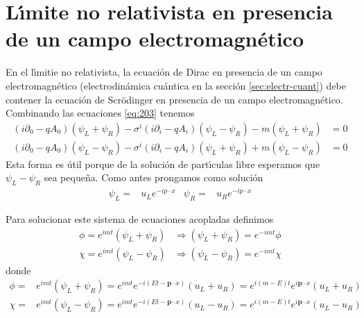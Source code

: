 \section{L\'\i mite no relativista en presencia de un campo electromagn\'etico}
\label{sec:limite-no-relat}
En el l\'\i mitie no relativista, la ecuaci\'on de Dirac en presencia de un campo electromagn\'etico (electrodin\'amica cu\'antica en la secci\'on \ref{sec:electr-cuant}) debe contener la ecuaci\'on de Scr\"odinger en presencia de un campo electromagn\'etico.
Combinando las ecuaciones \eqref{eq:203} tenemos
\begin{align}
  \label{eq:204}
  (i\partial_0- q A_0)(\psi_L+\psi_R)-{\sigma}^i(i\partial_i-q A_i)(\psi_L-\psi_R) -m(\psi_L+\psi_R) &=0\nonumber\\
  (i\partial_0-q A_0)(\psi_L-\psi_R)-{\sigma}^i(i\partial_i-q A_i)(\psi_L+\psi_R) +m(\psi_L-\psi_R) &=0
\end{align}
Esta forma es \'util porque de la soluci\'on de part\'\i culas libre esperamos que $\psi_L-\psi_R$ sea peque\~na. 
Como antes prongamos como soluci\'on
\begin{align}
  \psi_L=&u_L e^{-i p\cdot x} & \psi_R=&u_R e^{-i p\cdot x}
\end{align}

Para solucionar este sistema de ecuaciones acopladas definimos
\begin{align}
  \label{eq:216}
  \phi=e^{i m t}(\psi_L+\psi_R)&\Rightarrow(\psi_L+\psi_R)=e^{-i m t}\phi\nonumber\\
  \chi=e^{i m t}(\psi_L-\psi_R)&\Rightarrow(\psi_L-\psi_R)=e^{-i m t}\chi
\end{align}
donde
\begin{align}
\label{eq:260}
    \phi=&e^{i m t}(\psi_L+\psi_R)=e^{i m t}e^{-i (Et-\mathbf{p}\cdot x)}(u_L+u_R)=e^{i(m-E)t}e^{i\mathbf{p}\cdot x}(u_L+u_R)\nonumber\\
    \chi=&e^{i m t}(\psi_L-\psi_R)=e^{i m t}e^{-i (Et-\mathbf{p}\cdot x)}(u_L-u_R)=e^{i(m-E)t}e^{i\mathbf{p}\cdot x}(u_L-u_R)
\end{align}

